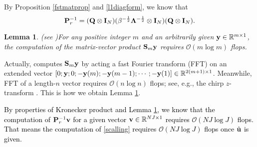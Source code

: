 \documentclass[11pt]{article}%
\numberwithin{equation}{section}
\newtheorem{lemma}[theorem]{Lemma}
\newtheorem{proposition}{Proposition}
\newenvironment{proof}{\noindent{\bf Proof:}}{\hfill\fbox{}\vspace*{1mm}}
\begin{document}
By Proposition \ref{fstmatprop} and \eqref{l1diagform}, we know that
\begin{equation*}
{\bf P}_r^{-1}=({\bf Q}\otimes{\bf I}_N)(\beta^{-\frac{1}{2}}{\bf \Lambda}^{-\frac{1}{2}}\otimes {\bf I}_N)({\bf Q}\otimes{\bf I}_N).
\end{equation*} 
%
\begin{lemma}\textnormal{(see \cite[Algorithm 1.4.2]{goluvan2013})}\label{1dsineimplemt}
	For any positive integer $m$ and an arbitrarily given ${\bf y}\in\mathbb{R}^{m\times 1}$, the computation of the matrix-vector product ${\bf S}_m{\bf y}$ requires $\mathcal{O}(m\log m)$ flops. 
\end{lemma}
\begin{proof}
	Actually, \cite[Algorithm 1.4.2]{goluvan2013} computes ${\bf S}_m{\bf y}$ by acting a fast Fourier transform (FFT) on an extended vector $[0;{\bf y};0;-{\bf y}(m);-{\bf y}(m-1);\cdots;-{\bf y}(1)]\in\mathbb{R}^{2(m+1)\times 1}$. Meanwhile, FFT of a length-$n$  vector requires $\mathcal{O}(n\log n)$ flops; see, e.g., the chirp $z$-transform \cite{rabiner1969chirp}. This is how we obtain Lemma \ref{1dsineimplemt}.
\end{proof}

\textcolor{black}{By properties of Kronecker product and Lemma \ref{1dsineimplemt}, we know that the computation of  ${\bf P}_r^{-1}{\bf v}$  for a given vector  ${\bf v}\in\mathbb{R}^{NJ\times 1}$ requires $\mathcal{O}(NJ\log J)$ flops. That means the computation of \eqref{scalling} requires $\mathcal{O}(NJ\log J)$ flops once $\hat{\bf u}$ is given.}
\end{document}
